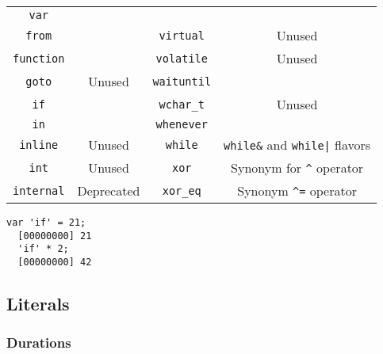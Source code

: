 \documentclass[openright,twoside,12pt]{report}
\begin{document}
\begin{table}[\floatpos]
\begin{tabular}{|c|c||c|c|}
    \lstinline"var"               &                                         \\
    \lstinline"from"              &                                         &
    \lstinline"virtual"           & Unused                                  \\
    \lstinline"function"          &                                         &
    \lstinline"volatile"          & Unused                                  \\
    \lstinline"goto"              & Unused                                  &
    \lstinline"waituntil"         &                                         \\
    \lstinline"if"                &                                         &
    \lstinline"wchar_t"           & Unused                                  \\
    \lstinline"in"                &                                         &
    \lstinline"whenever"          &                                         \\
    \lstinline"inline"            & Unused                                  &
    \lstinline"while"             & \lstinline|while&| and
                                    \lstinline-while|- flavors              \\
    \lstinline"int"               & Unused                                  &
    \lstinline"xor"               & Synonym for \lstinline|^| operator      \\
    \lstinline"internal"          & Deprecated                              &
    \lstinline"xor_eq"            & Synonym \lstinline|^=| operator         \\
    \hline
  \end{tabular}
\end{table}
\renewcommand{\baselinestretch}{1}

\begin{lstlisting}[caption=Escaping keywords,label=lst:escape-keyword,float=\floatpos]
  var 'if' = 21;
  [00000000] 21
  'if' * 2;
  [00000000] 42
\end{lstlisting}

\subsection{Literals}
\subsubsection{Durations}
\end{document}
